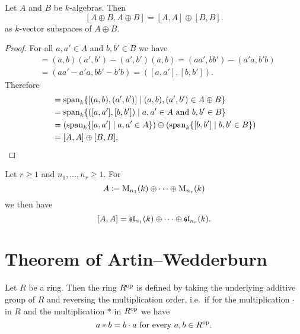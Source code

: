\begin{lem}
  Let $A$ and $B$ be $k$-algebras. Then
  \[
    [A \oplus B, A \oplus B] = [A,A] \oplus [B,B].
  \]
  as $k$-vector subspaces of $A \oplus B$.
\end{lem}
\begin{proof}
  For all $a, a' \in A$ and $b, b' \in B$ we have
  \begin{align*}
    [(a,b),(a',b')]
    &= (a,b)(a',b') - (a',b')(a,b)
    = (aa',bb') - (a'a, b'b) \\
    &= (aa'-a'a, bb' - b'b)
    = ([a,a'], [b,b']).
  \end{align*}
  Therefore
  \begin{align*}
    [A \oplus B, A \oplus B]
    &= \vspan_k \{ [(a,b), (a',b')] \mid (a,b), (a',b') \in A \oplus B \} \\
    &= \vspan_k \{ ([a,a'], [b,b']) \mid a, a' \in A \text{ and } b, b' \in B \} \\
    &= \left( \vspan_k \{[a,a'] \mid a,a' \in A\} \right) \oplus \left( \vspan_k \{[b,b'] \mid b,b' \in B\} \right) \\
    &= [A,A] \oplus [B,B].
    \qedhere
  \end{align*}
\end{proof}


\begin{cor}\label{cor: commutator product of matrix algebras}
  Let $r \geq 1$ and $n_1, \dots, n_r \geq 1$. For
  \[
    A \coloneqq \operatorname{M}_{n_1}(k) \oplus \dotsb \oplus \operatorname{M}_{n_r}(k)
  \]
  we then have
  \[
    [A,A]
    = \operatorname{\mathfrak{sl}}_{n_1}(k) \oplus \dotsb \oplus \operatorname{\mathfrak{sl}}_{n_r}(k).
  \]
\end{cor}





\section{Theorem of Artin--Wedderburn}


\begin{defi}
  Let $R$ be a ring. Then the ring $R^{\mathrm{op}}$ is defined by taking the underlying additive group of $R$ and reversing the multiplication order, i.e.\ if for the multiplication $\cdot$ in $R$ and the multiplication $*$ in $R^{\mathrm{op}}$ we have
  \[
    a * b = b \cdot a \text{ for every } a,b \in R^{\mathrm{op}}.
  \]
\end{defi}


